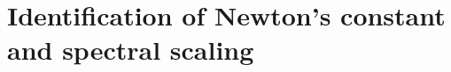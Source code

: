 \section{Identification of Newton's constant and spectral scaling}
  \label{sec:newton-identification}

  
  
  
